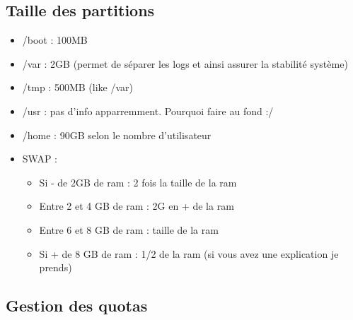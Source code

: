 \documentclass[a4paper]{article}
\begin{document}
      \subsection{Taille des partitions}
      \begin{itemize}[label=\textbullet, font=\Large]
        \item /boot : 100MB
        \item /var : 2GB (permet de séparer les logs et ainsi assurer la stabilité système)
        \item /tmp : 500MB (like /var)
        \item /usr : pas d'info apparremment. Pourquoi faire au fond :/
        \item /home : 90GB selon le nombre d'utilisateur
        \item SWAP :
        \begin{itemize}[label=, font=\scriptsize] 
          \item Si - de 2GB de ram : 2 fois la taille de la ram
          \item Entre 2 et 4 GB de ram : 2G en + de la ram
          \item Entre 6 et 8 GB de ram : taille de la ram
          \item Si + de 8 GB de ram : 1/2 de la ram (si vous avez une explication je prends)
        \end{itemize}
      \end{itemize}

      \subsection{Gestion des quotas}
\end{document}
